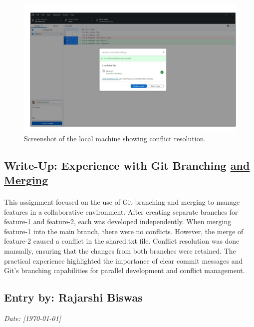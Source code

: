 \documentclass[a4paper,12pt]{article}
\begin{document}
\vspace{-2cm}
\begin{figure}[h!]
    \centering
    \includegraphics[width=0.8\linewidth]{conflict.png} %
    \hspace{4 cm}
    \caption{Screenshot of the local machine showing conflict resolution.}
\end{figure}

\subsection*{\LARGE{Write-Up: Experience with Git Branching {\underline{and Merging}}}}
\hspace{1 cm}
\paragraph{}
This assignment focused on the use of Git branching and merging to manage features in a collaborative environment. After creating separate branches for feature-1 and feature-2, each was developed independently.
When merging feature-1 into the main branch, there were no conflicts. However, the merge of feature-2 caused a conflict in the shared.txt file. Conflict resolution was done manually, ensuring that the changes from both branches were retained.
The practical experience highlighted the importance of clear commit messages and Git’s branching capabilities for parallel development and conflict management.

\newpage
{}
\vspace{-2cm}
\subsection*{Entry by: Rajarshi Biswas}
\textit{Date: [\today]}\\
\end{document}
